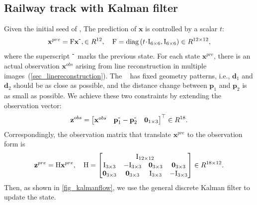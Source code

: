 \subsection{Railway track with Kalman filter}
Given the initial seed of \rlp,
The prediction of $\mathbf x$ is controlled by a scalar $t$:
\begin{equation}
        \mathbf{x}^{pre}= 
        \mathrm F \mathbf x^{{\mbox -}}, \in R^{12}, \quad  
        \mathrm F=\operatorname{diag}\left(t \! \cdot \! \mathrm I_{6\times6} , \mathrm I_{6\times6}\right) \in R^{12\times 12},
        \label {eq_statetransition}
\end{equation}
where the superscript $^{\mbox -}$ marks the previous state.
For each state $\mathbf{x}^{pre}$,
there is an actual observation $\mathbf{x}^{obs}$ arising from line reconstruction in multiple images~(\cref*{sec_linereconstruction}).
The \rlp~ has fixed geometry patterns,
i.e.,
$\mathbf d_1$ and $\mathbf d_2$ should be as close as possible,
and the distance change between $\mathbf p_1$ and $\mathbf p_2$ is as small as possible.
We achieve these two constraints by extending the observation vector:
\begin{equation}
\mathbf{z}^{obs} = \begin{bmatrix}
    \mathbf{x}^{obs} & \mathbf p_1^{\mbox -} - \mathbf p_{2}^{\mbox -} & \mathbf 0_{1\times3}
\end{bmatrix}^ \top \in R^{18}.
\label {eq_observationvector}
\end{equation}
Correspondingly,
the observation matrix that translate $\mathbf{x}^{pre}$ to the observation form is
\begin{equation}
        \mathbf{z}^{pre}= 
        \mathrm H \mathbf x^{pre}, \quad  
        \mathrm H=
        \begin{bmatrix}
            \multicolumn{4}{c}{\mathrm{I}_{12 \times 12}} \\
            \mathrm{I}_{3 \times 3} & -\mathrm{I}_{3 \times 3} & \mathbf{0}_{3 \times 3} & \mathbf{0}_{3 \times 3} \\
            \mathbf{0}_{3 \times 3} & \mathbf{0}_{3 \times 3} & \mathrm{I}_{3 \times 3} & -\mathrm{I}_{3 \times 3}
        \end{bmatrix} \in R^{18 \times 12}.
        \label {eq_observationmatrix }
\end{equation}
Then,
as shown in \cref{fig_kalmanflow},
we use the general discrete Kalman filter to update the state.
